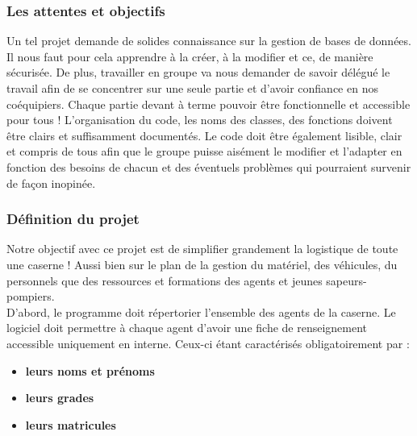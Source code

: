 \subsubsection{Les attentes et objectifs}
Un tel projet demande de solides connaissance sur la gestion de bases de données. Il nous faut pour cela apprendre à la créer, à la modifier et ce, de manière sécurisée. De plus, travailler en groupe va nous demander de savoir délégué le travail afin de se concentrer sur une seule partie et d'avoir confiance en nos coéquipiers. Chaque partie devant à terme pouvoir être fonctionnelle et accessible pour tous ! L'organisation du code, les noms des classes, des fonctions doivent être clairs et suffisamment documentés. Le code doit être également lisible, clair et compris de tous afin que le groupe puisse aisément le modifier et l'adapter en fonction des besoins de chacun et des éventuels problèmes qui pourraient survenir de façon inopinée.

\subsubsection{Définition du projet}
Notre objectif avec ce projet est de simplifier grandement la logistique de toute une caserne ! Aussi bien sur le plan de la gestion du matériel, des véhicules, du personnels que des ressources et formations des agents et jeunes sapeurs-pompiers. \\

D'abord, le programme doit répertorier l'ensemble des agents de la caserne. Le logiciel doit permettre à chaque agent d'avoir une fiche de renseignement accessible uniquement en interne. Ceux-ci étant caractérisés obligatoirement par : 
\begin{itemize}
  \item \textbf{leurs noms et prénoms}
  \item \textbf{leurs grades}
  \item \textbf{leurs matricules}\\
\end{itemize}

